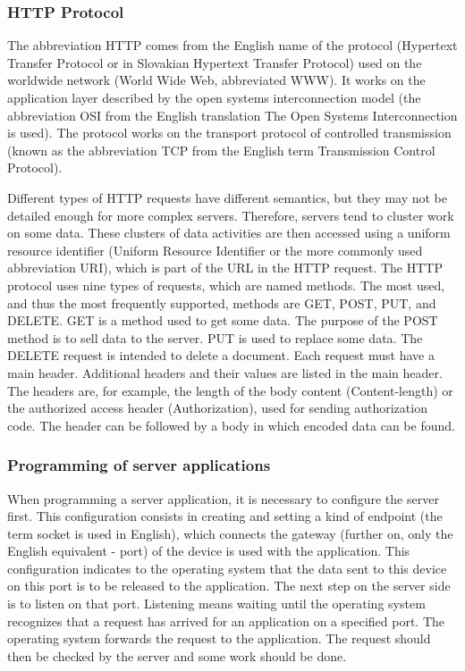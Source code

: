 \documentclass[
  biblatex,
  language=english,
  figures=false,
  sourcecodes,
  glossaries,
  index
]{kidiplom}
\begin{document}
\subsubsection{HTTP Protocol}
The abbreviation HTTP comes from the English name of the protocol (Hypertext Transfer Protocol or in Slovakian Hypertext Transfer Protocol) used on the worldwide network (World Wide Web, abbreviated WWW). It works on the application layer described by the open systems interconnection model (the abbreviation OSI from the English translation The Open Systems Interconnection is used)\cite{bib1}. The protocol works on the transport protocol of controlled transmission (known as the abbreviation TCP from the English term Transmission Control Protocol).

Different types of HTTP requests have different semantics, but they may not be detailed enough for more complex servers. Therefore, servers tend to cluster work on some data. These clusters of data activities are then accessed using a uniform resource identifier (Uniform Resource Identifier or the more commonly used abbreviation URI), which is part of the URL in the HTTP request. The HTTP protocol uses nine types of requests, which are named methods. The most used, and thus the most frequently supported, methods are GET, POST, PUT, and DELETE. GET is a method used to get some data. The purpose of the POST method is to sell data to the server. PUT is used to replace some data. The DELETE request is intended to delete a document.
Each request must have a main header. Additional headers and their values are listed in the main header. The headers are, for example, the length of the body content (Content-length) or the authorized access header (Authorization), used for sending authorization code. The header can be followed by a body in which encoded data can be found.

\subsubsection{Programming of server applications}
When programming a server application, it is necessary to configure the server first. This configuration consists in creating and setting a kind of endpoint (the term socket is used in English), which connects the gateway (further on, only the English equivalent - port) of the device is used with the application. This configuration indicates to the operating system that the data sent to this device on this port is to be released to the application. The next step on the server side is to listen on that port. Listening means waiting until the operating system recognizes that a request has arrived for an application on a specified port. The operating system forwards the request to the application. The request should then be checked by the server and some work should be done. 
\end{document}
